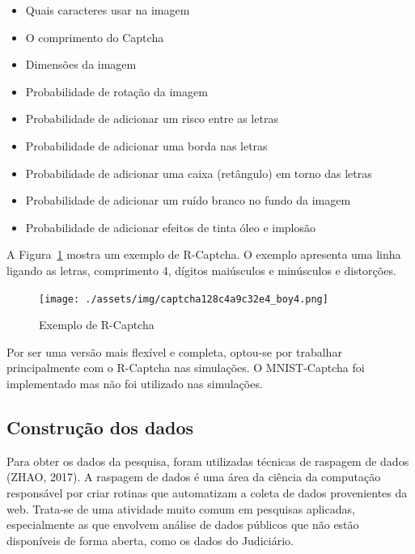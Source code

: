 \documentclass[12pt,twoside,brazilian]{book}
\providecommand{\tightlist}{%
  \setlength{\itemsep}{0pt}\setlength{\parskip}{0pt}}
\begin{document}
\begin{itemize}
\tightlist
\item
  Quais caracteres usar na imagem
\item
  O comprimento do Captcha
\item
  Dimensões da imagem
\item
  Probabilidade de rotação da imagem
\item
  Probabilidade de adicionar um risco entre as letras
\item
  Probabilidade de adicionar uma borda nas letras
\item
  Probabilidade de adicionar uma caixa (retângulo) em torno das letras
\item
  Probabilidade de adicionar um ruído branco no fundo da imagem
\item
  Probabilidade de adicionar efeitos de tinta óleo e implosão
\end{itemize}

A Figura~\ref{fig-captcha-r} mostra um exemplo de R-Captcha. O exemplo
apresenta uma linha ligando as letras, comprimento 4, dígitos maiúsculos
e minúsculos e distorções.

\begin{figure}

{\centering \texttt{[image: ./assets/img/captcha128c4a9c32e4\_boy4.png]}

}

\caption{\label{fig-captcha-r}Exemplo de R-Captcha}

\end{figure}

Por ser uma versão mais flexível e completa, optou-se por trabalhar
principalmente com o R-Captcha nas simulações. O MNIST-Captcha foi
implementado mas não foi utilizado nas simulações.

\hypertarget{sec-construcao-dados}{%
\subsection{Construção dos dados}\label{sec-construcao-dados}}

Para obter os dados da pesquisa, foram utilizadas técnicas de raspagem
de dados (ZHAO, 2017). A raspagem de dados é uma área da ciência da
computação responsável por criar rotinas que automatizam a coleta de
dados provenientes da web. Trata-se de uma atividade muito comum em
pesquisas aplicadas, especialmente as que envolvem análise de dados
públicos que não estão disponíveis de forma aberta, como os dados do
Judiciário.
\end{document}
